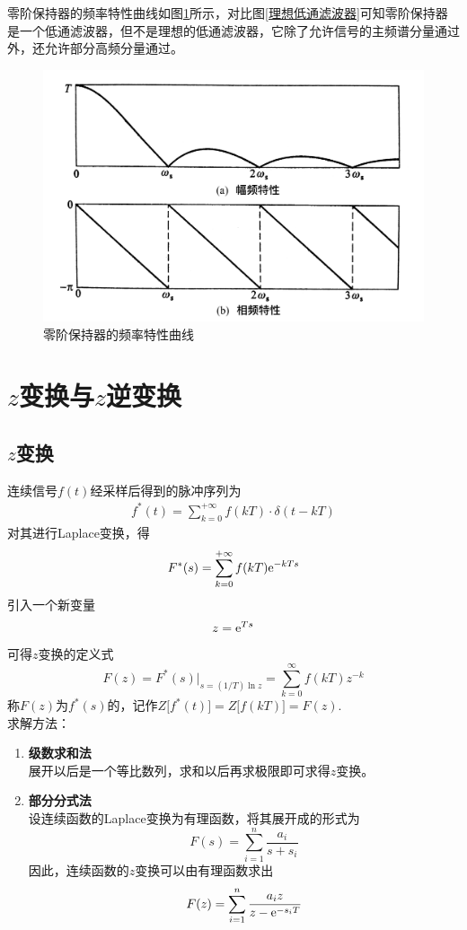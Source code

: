 零阶保持器的频率特性曲线如图\ref{零阶保持器幅频特性}所示，对比图\ref{理想低通滤波器}可知零阶保持器是一个低通滤波器，但不是理想的低通滤波器，它除了允许信号的主频谱分量通过外，还允许部分高频分量通过。
\begin{figure}[!htb]
	\centering
	\includegraphics[width = 0.56\linewidth]{pic/零阶保持器幅频特性.jpg}
	\vspace*{-1em}
	\caption{零阶保持器的频率特性曲线}
	\label{零阶保持器幅频特性}
\end{figure}

\section{$z$变换与$z$逆变换}
\subsection{$z$变换}
连续信号$f(t)$经采样后得到的脉冲序列为
\begin{align}
	f^*(t) = \sum_{k = 0}^{+\infty}f(kT)\cdot \delta(t -kT)
\end{align}
对其进行Laplace变换，得
\begin{equation}
	F^*(s) = \sum_{k = 0}^{+\infty}f(kT){\rm{e}}^{-kTs}
\end{equation}
引入一个新变量
\begin{equation}
	z = {\rm{e}}^{Ts}
\end{equation}
可得$z$变换的定义式
\begin{equation}
	F(z) = F^*(s)\big|_{s=(1/T)\ln z} = \sum_{k=0}^{\infty} f(kT)z^{-k}
\end{equation}
称$F(z)$为$f^*(s)$的，记作$Z\big[f^*(t)\big]=Z\big[f(kT)\big]=F(z).$\\
求解方法：
\begin{enumerate}[\textbf{方法} 1 ]
	\item \textbf{级数求和法}\\
	展开以后是一个等比数列，求和以后再求极限即可求得$z$变换。
	\item \textbf{部分分式法}\\
	设连续函数的Laplace变换为有理函数，将其展开成的形式为
	\begin{equation}
		F(s) = \sum_{i = 1}^{n} \dfrac{a_i}{s+s_i}
	\end{equation}
	因此，连续函数的$z$变换可以由有理函数求出
	\begin{equation}
		F(z) = \sum_{i=1}^{n} \dfrac{a_i z}{z - {\rm{e}}^{-s_iT}}
	\end{equation}
\end{enumerate}

